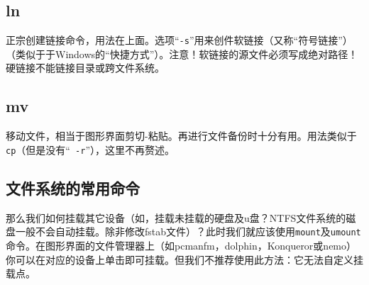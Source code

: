 \subsection{ln}
\cite{ln}\par
正宗创建链接命令，用法在上面。选项“\verb|-s|”用来创件软链接（又称“符号链接”）（类似于于Windows的“快捷方式”）。注意！软链接的源文件必须写成绝对路径！硬链接不能链接目录或跨文件系统。
\subsection{mv}
移动文件，相当于图形界面剪切-粘贴。再进行文件备份时十分有用。用法类似于\verb|cp|（但是没有“\verb| -r|”），这里不再赘述。
\subsection{文件系统的常用命令}
那么我们如何挂载其它设备（如，挂载未挂载的硬盘及u盘？NTFS文件系统的磁盘一般不会自动挂载。除非修改fstab文件）？此时我们就应该使用\verb|mount|及\verb|umount|命令。在图形界面的文件管理器上（如pcmanfm，dolphin，Konqueror或nemo）你可以在对应的设备上单击即可挂载。但我们不推荐使用此方法：它无法自定义挂载点。\par
